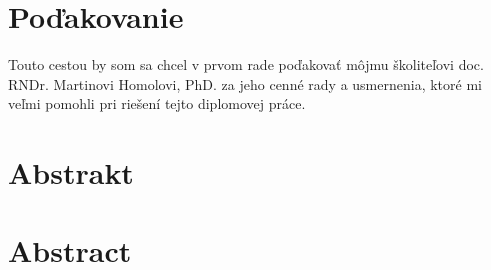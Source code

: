 \documentclass[12pt, a4paper, oneside]{book}
\begin{document}
\chapter*{Poďakovanie}\label{chap:thank_you}
Touto cestou by som sa chcel v prvom rade poďakovať môjmu školiteľovi doc. RNDr. Martinovi Homolovi, PhD. za jeho cenné rady a usmernenia, ktoré mi veľmi pomohli pri riešení tejto diplomovej práce. 
\vfill\eject 

\chapter*{Abstrakt}\label{chap:abstract_sk}


\chapter*{Abstract}\label{chap:abstract_en}


\tableofcontents

\mainmatter



\backmatter

\nocite{*}



\listoffigures
\end{document}
